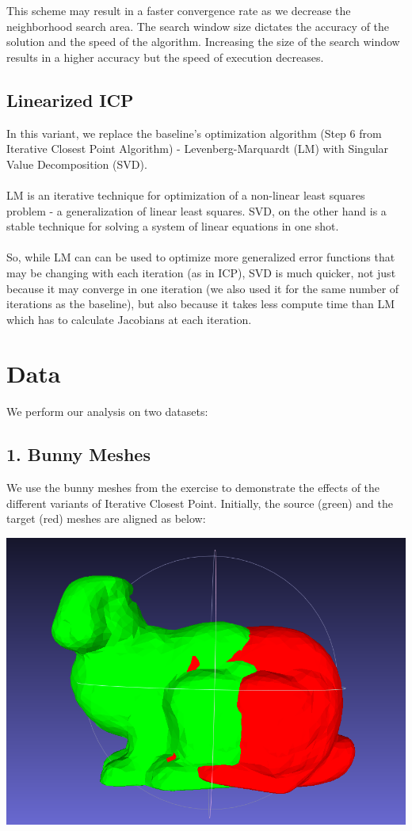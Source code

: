\documentclass[a4paper,pagesize 10pt]{scrartcl}
\begin{document}
This scheme may result in a faster convergence rate as we decrease the neighborhood search area. The search window size dictates the accuracy of the solution and the speed of the algorithm. Increasing the size of the search window results in a higher accuracy but the speed of execution decreases.

\subsection*{Linearized ICP}
In this variant, we replace the baseline's optimization algorithm (Step 6 from Iterative Closest Point Algorithm) - Levenberg-Marquardt (LM) with Singular Value Decomposition (SVD). \\\\
LM is an iterative technique for optimization of a non-linear least squares problem - a generalization of linear least squares. SVD, on the other hand is a stable technique for solving a system of linear equations in one shot.\\\\
So, while LM can can be used to optimize more generalized error functions that may be changing with each iteration (as in ICP), SVD is much quicker, not just because it may converge in one iteration (we also used it for the same number of iterations as the baseline), but also because it takes less compute time than LM which has to calculate Jacobians at each iteration.

\section*{Data}
We perform our analysis on two datasets:

\subsection*{1. Bunny Meshes}
We use the bunny meshes from the exercise \cite{Ex} to demonstrate the effects of the different variants of Iterative Closest Point. Initially, the source (green) and the target (red) meshes are aligned as below:
\begin{center}
    \includegraphics[scale=0.20]{ICP_analysis_bunny_data.png}
\end{center}
\end{document}

